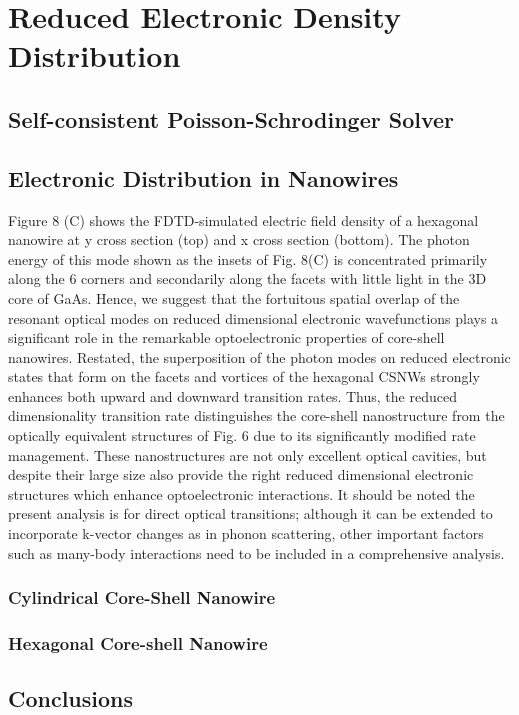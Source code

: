 \chapter{Reduced Electronic Density Distribution} \label{ED}

\section{Self-consistent Poisson-Schrodinger Solver} \label{sec:model}



\section{Electronic Distribution in Nanowires} \label{sec:spectra}
Figure 8 (C) shows the FDTD-simulated electric field density of a hexagonal nanowire at y cross section (top) and x cross section (bottom). The photon energy of this mode shown as the insets of Fig. 8(C) is concentrated primarily along the 6 corners and secondarily along the facets with little light in the 3D core of GaAs. Hence, we suggest that the fortuitous spatial overlap of the resonant optical modes on reduced dimensional electronic wavefunctions plays a significant role in the remarkable optoelectronic properties of core-shell nanowires. Restated, the superposition of the photon modes  on reduced electronic states that form on the facets and vortices of the hexagonal CSNWs strongly enhances both upward and downward transition rates.  Thus, the reduced dimensionality transition rate distinguishes the core-shell nanostructure from the optically equivalent structures of Fig. 6 due to its significantly modified rate management. These nanostructures are not only excellent optical cavities, but despite their large size also provide the right reduced dimensional electronic structures which enhance optoelectronic interactions.  It should be noted the present analysis is for direct optical transitions; although it can be extended to incorporate k-vector changes as in phonon scattering, other important factors such as many-body interactions need to be included in a comprehensive analysis.

\subsection{Cylindrical Core-Shell Nanowire}

\subsection{Hexagonal Core-shell Nanowire} \label{sec:indv_lines}
\section{Conclusions} \label{sec:conclusions}


